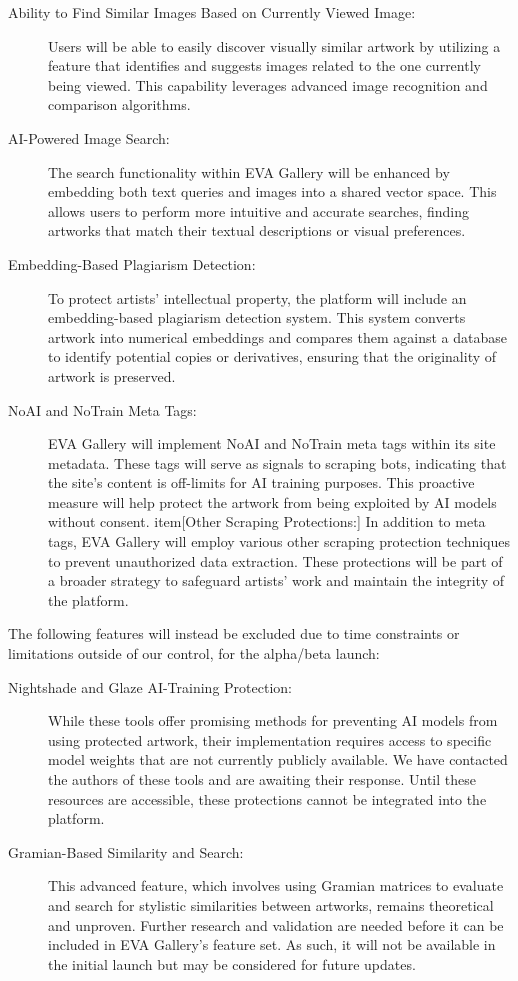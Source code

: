 \begin{description}
    \item[Ability to Find Similar Images Based on Currently Viewed Image:] Users will be able to easily discover visually similar artwork by utilizing a feature that identifies and suggests images related to the one currently being viewed. This capability leverages advanced image recognition and comparison algorithms.
    \item[AI-Powered Image Search:] The search functionality within EVA Gallery will be enhanced by embedding both text queries and images into a shared vector space. This allows users to perform more intuitive and accurate searches, finding artworks that match their textual descriptions or visual preferences.
    \item[Embedding-Based Plagiarism Detection:] To protect artists’ intellectual property, the platform will include an embedding-based plagiarism detection system. This system converts artwork into numerical embeddings and compares them against a database to identify potential copies or derivatives, ensuring that the originality of artwork is preserved.
    \item[NoAI and NoTrain Meta Tags:] EVA Gallery will implement NoAI and NoTrain meta tags within its site metadata. These tags will serve as signals to scraping bots, indicating that the site’s content is off-limits for AI training purposes. This proactive measure will help protect the artwork from being exploited by AI models without consent.
    item[Other Scraping Protections:] In addition to meta tags, EVA Gallery will employ various other scraping protection techniques to prevent unauthorized data extraction. These protections will be part of a broader strategy to safeguard artists' work and maintain the integrity of the platform.
\end{description}

\noindent
The following features will instead be excluded due to time constraints or limitations outside of our control, for the alpha/beta launch:

\begin{description}
    \item[Nightshade and Glaze AI-Training Protection:] While these tools offer promising methods for preventing AI models from using protected artwork, their implementation requires access to specific model weights that are not currently publicly available. We have contacted the authors of these tools and are awaiting their response. Until these resources are accessible, these protections cannot be integrated into the platform.
    \item[Gramian-Based Similarity and Search:] This advanced feature, which involves using Gramian matrices to evaluate and search for stylistic similarities between artworks, remains theoretical and unproven. Further research and validation are needed before it can be included in EVA Gallery's feature set. As such, it will not be available in the initial launch but may be considered for future updates.
\end{description}
\newpage

